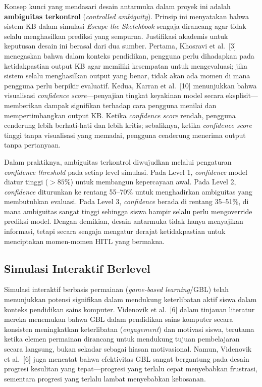 Konsep kunci yang mendasari desain antarmuka dalam proyek ini adalah \textbf{ambiguitas terkontrol} (\textit{controlled ambiguity}). Prinsip ini menyatakan bahwa sistem KB dalam simulasi \textit{Escape the Sketchbook} sengaja dirancang agar tidak selalu menghasilkan prediksi yang sempurna. Justifikasi akademis untuk keputusan desain ini berasal dari dua sumber. Pertama, Khosravi et al.\ [3] menegaskan bahwa dalam konteks pendidikan, pengguna perlu dihadapkan pada ketidakpastian output KB agar memiliki kesempatan untuk mengevaluasi; jika sistem selalu menghasilkan output yang benar, tidak akan ada momen di mana pengguna perlu berpikir evaluatif. Kedua, Karran et al.\ [10] menunjukkan bahwa visualisasi \textit{confidence score}---penyajian tingkat keyakinan model secara eksplisit---memberikan dampak signifikan terhadap cara pengguna menilai dan mempertimbangkan output KB. Ketika \textit{confidence score} rendah, pengguna cenderung lebih berhati-hati dan lebih kritis; sebaliknya, ketika \textit{confidence score} tinggi tanpa visualisasi yang memadai, pengguna cenderung menerima output tanpa pertanyaan.

Dalam praktiknya, ambiguitas terkontrol diwujudkan melalui pengaturan \textit{confidence threshold} pada setiap level simulasi. Pada Level 1, \textit{confidence} model diatur tinggi ($>85\%$) untuk membangun kepercayaan awal. Pada Level 2, \textit{confidence} diturunkan ke rentang 55--70\% untuk menghadirkan ambiguitas yang membutuhkan evaluasi. Pada Level 3, \textit{confidence} berada di rentang 35--51\%, di mana ambiguitas sangat tinggi sehingga siswa hampir selalu perlu mengoverride prediksi model. Dengan demikian, desain antarmuka tidak hanya menyajikan informasi, tetapi secara sengaja mengatur derajat ketidakpastian untuk menciptakan momen-momen HITL yang bermakna.

\subsection{Simulasi Interaktif Berlevel}
\label{subsec:simulasi-interaktif}

Simulasi interaktif berbasis permainan (\textit{game-based learning}/GBL) telah menunjukkan potensi signifikan dalam mendukung keterlibatan aktif siswa dalam konteks pendidikan sains komputer. Videnovik et al.\ [6] dalam tinjauan literatur mereka menemukan bahwa GBL dalam pendidikan sains komputer secara konsisten meningkatkan keterlibatan (\textit{engagement}) dan motivasi siswa, terutama ketika elemen permainan dirancang untuk mendukung tujuan pembelajaran secara langsung, bukan sekadar sebagai hiasan motivasional. Namun, Videnovik et al.\ [6] juga mencatat bahwa efektivitas GBL sangat bergantung pada desain progresi kesulitan yang tepat---progresi yang terlalu cepat menyebabkan frustrasi, sementara progresi yang terlalu lambat menyebabkan kebosanan.

